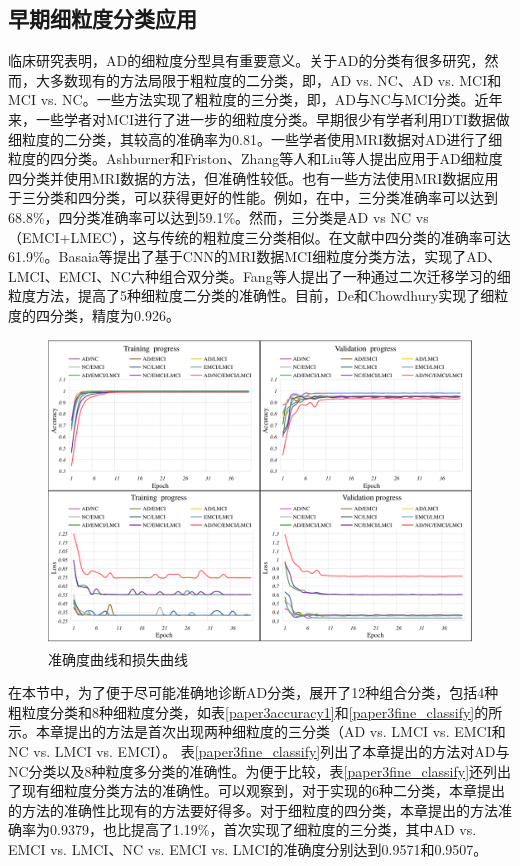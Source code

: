 \subsection{早期细粒度分类应用}
临床研究表明，AD的细粒度分型具有重要意义。关于AD的分类有很多研究，然而，大多数现有的方法局限于粗粒度的二分类，即，AD vs. NC、AD vs. MCI和MCI vs. NC。一些方法实现了粗粒度的三分类，即，AD与NC与MCI分类。近年来，一些学者对MCI进行了进一步的细粒度分类。早期很少有学者利用DTI数据做细粒度的二分类\cite{prasad2015brain, 2020Convolutional}，其较高的准确率为0.81。一些学者使用MRI数据对AD进行了细粒度的四分类。Ashburner和Friston\cite{ashburner2000voxel}、Zhang等人\cite{zhang2016detecting}和Liu等人\cite{liu2018joint}提出应用于AD细粒度四分类并使用MRI数据的方法，但准确性较低。也有一些方法使用MRI数据应用于三分类和四分类，可以获得更好的性能。例如，在\cite{sorensen2018ensemble}中，三分类准确率可以达到68.8\%，四分类准确率可以达到59.1\%。然而，三分类是AD vs NC vs（EMCI+LMEC），这与传统的粗粒度三分类相似。在文献\cite{dimitriadis2018random}中四分类的准确率可达61.9\%。Basaia等\cite{2018Automated}提出了基于CNN的MRI数据MCI细粒度分类方法，实现了AD、LMCI、EMCI、NC六种组合双分类。Fang等人\cite{Fangmeie2022}提出了一种通过二次迁移学习的细粒度方法，提高了5种细粒度二分类的准确性。目前，De和Chowdhury\cite{de2021dti}实现了细粒度的四分类，精度为0.926。

     \begin{figure}[ht]
      \centering
      \includegraphics[width=0.9\linewidth]{figs/paper3lossandaccuracy.pdf}
      \caption{准确度曲线和损失曲线}\label{paper3curves}
    \end{figure}
    
在本节中，为了便于尽可能准确地诊断AD分类，展开了12种组合分类，包括4种粗粒度分类和8种细粒度分类，如表\ref{paper3accuracy1}和\ref{paper3fine_classify}的所示。本章提出的方法是首次出现两种细粒度的三分类（AD vs. LMCI vs. EMCI和NC vs. LMCI vs. EMCI）。
表\ref{paper3fine_classify}列出了本章提出的方法对AD与NC分类以及8种粒度多分类的准确性。为便于比较，表\ref{paper3fine_classify}还列出了现有细粒度分类方法的准确性。可以观察到，对于实现的6种二分类，本章提出的方法的准确性比现有的方法\cite{2018Automated,Fangmeie2022}要好得多。对于细粒度的四分类，本章提出的方法准确率为0.9379，也比\cite{de2021dti}提高了1.19\%，首次实现了细粒度的三分类，其中AD vs. EMCI vs. LMCI、NC vs. EMCI vs. LMCI的准确度分别达到0.9571和0.9507。

